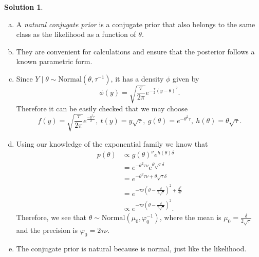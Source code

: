 \documentclass{article}
\theoremstyle{plain}
\theoremstyle{definition}
\newtheorem*{sol*}{Solution}
\begin{document}
\begin{sol*}\
\begin{enumerate}[(a)]
\item A \emph{natural conjugate prior} is a conjugate prior that also belongs to the same class as the likelihood as a function of $\theta$.
\item They are convenient for calculations and ensure that the posterior follows a known parametric form. 
\item Since $Y\mid\theta\sim\mathrm{Normal}(\theta,\tau^{-1})$, it has a density $\phi$ given by
\[
\phi(y)=\sqrt{\frac{\tau}{2\pi}}e^{-\frac{\tau}{2}(y-\theta)^2}.
\]
Therefore it can be easily checked that we may choose  
\[f(y)=\sqrt{\frac{\tau}{2\pi}}e^{\frac{-y^2\tau}{2}},\ t(y)=y\sqrt{\tau},\ g(\theta)=e^{-\theta^2\tau},\ h(\theta)=\theta\sqrt{\tau}.\]

\item Using our knowledge of the exponential family we know that 
\begin{align*}
p(\theta) & \propto g(\theta)^\nu e^{h(\theta)\delta}\\
& = e^{-\theta^2\tau\nu}e^{\theta\sqrt{\tau}\delta}\\
& =  e^{-\theta^2\tau\nu+\theta\sqrt{\tau}\delta}\\
& = e^{-\tau\nu(\theta-\frac{\delta}{2\sqrt{\tau}})^2+\frac{\delta^2}{4\tau}}\\
& \propto e^{-\tau\nu(\theta-\frac{\delta}{2\sqrt{\tau}})^2}.
\end{align*}
Therefore, we see that $\theta\sim\mathrm{Normal}(\mu_0,\varphi_0^{-1})$, where the mean is $\mu_0=\frac{\delta}{2\sqrt{\tau}}$ and the precision is $\varphi_0=2\tau\nu$.

\item The conjugate prior is natural because is normal, just like the likelihood.


\end{enumerate}
\end{sol*}
\end{document}
